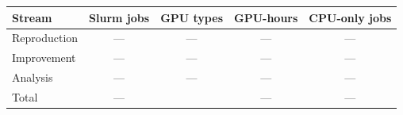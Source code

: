 \begin{tabular}{@{}lcccc@{}}
\toprule
Stream & Slurm jobs & GPU types & GPU-hours & CPU-only jobs\\
\midrule
Reproduction & --- & --- & --- & ---\\
Improvement & --- & --- & --- & ---\\
Analysis & --- & --- & --- & ---\\
\midrule
Total & --- & & --- & ---\\
\bottomrule
\end{tabular}
